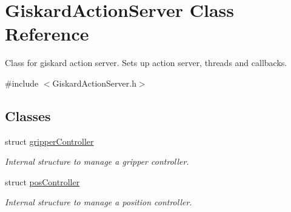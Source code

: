 \hypertarget{classGiskardActionServer}{\section{Giskard\-Action\-Server Class Reference}
\label{classGiskardActionServer}
}


Class for giskard action server. Sets up action server, threads and callbacks.  




{\ttfamily \#include $<$Giskard\-Action\-Server.\-h$>$}

\subsection*{Classes}
\begin{DoxyCompactItemize}
\item 
struct \hyperlink{structGiskardActionServer_1_1gripperController}{gripper\-Controller}
\begin{DoxyCompactList}\small\item\em Internal structure to manage a gripper controller. \end{DoxyCompactList}\item 
struct \hyperlink{structGiskardActionServer_1_1posController}{pos\-Controller}
\begin{DoxyCompactList}\small\item\em Internal structure to manage a position controller. \end{DoxyCompactList}\end{DoxyCompactItemize}
